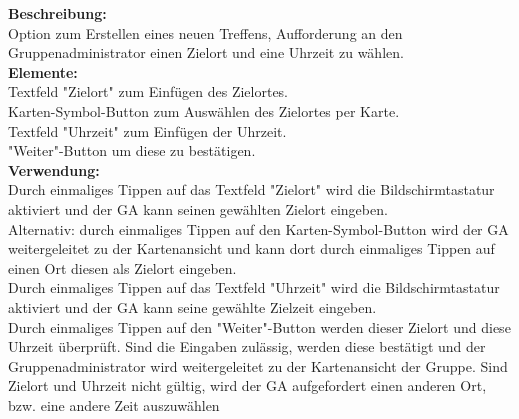 \textbf{Beschreibung:}\\
Option zum Erstellen eines neuen Treffens, Aufforderung an den Gruppenadministrator einen Zielort und eine Uhrzeit zu wählen.\\
\textbf{Elemente:}\\
Textfeld "Zielort" zum Einfügen des Zielortes.\\
Karten-Symbol-Button zum Auswählen des Zielortes per Karte.\\
Textfeld "Uhrzeit" zum Einfügen der Uhrzeit.\\
"Weiter"-Button um diese zu bestätigen.\\
\textbf{Verwendung:}\\
Durch einmaliges Tippen auf das Textfeld "Zielort" wird die Bildschirmtastatur aktiviert und der GA kann seinen gewählten Zielort eingeben.\\
Alternativ: durch einmaliges Tippen auf den Karten-Symbol-Button wird der GA weitergeleitet zu der Kartenansicht und kann dort durch einmaliges Tippen auf einen Ort diesen als Zielort eingeben.\\
Durch einmaliges Tippen auf das Textfeld "Uhrzeit" wird die Bildschirmtastatur aktiviert und der GA kann seine gewählte Zielzeit eingeben.\\
Durch einmaliges Tippen auf den "Weiter"-Button werden dieser Zielort und diese Uhrzeit überprüft. Sind die Eingaben zulässig, werden diese bestätigt und der Gruppenadministrator wird weitergeleitet zu der Kartenansicht der Gruppe. Sind Zielort und Uhrzeit nicht gültig, wird der GA aufgefordert einen anderen Ort, bzw. eine andere Zeit auszuwählen
\clearpage
\newpage



